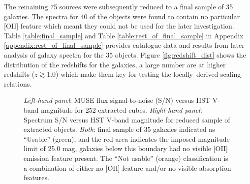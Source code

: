 \documentclass[12pt, twocolumn, nofootinbib]{revtex4-1}    %
\begin{document}
The remaining 75 sources were subsequently reduced to a final sample of 35 galaxies. The spectra for 40 of the objects were found to contain no particular [OII] feature which meant they could not be used for the later investigation. Table \ref{table:final_sample} and Table \ref{table:rest_of_final_sample} in Appendix \ref{appendix:rest_of_final_sample} provides catalogue data and results from later analysis of galaxy spectra for the 35 objects. Figure \ref{fig:redshift_dist} shows the distribution of the redshifts for the galaxies, a large number are at higher redshifts ($z\gtrsim1.0$) which make them key for testing the locally--derived scaling relations.  

\begin{figure}
  \caption[HUDF Objects]{\textit{Left-hand panel}: MUSE flux signal-to-noise (S/N) versus HST V-band magnitude for 252 extracted cubes. \textit{Right-hand panel}: Spectrum S/N versus HST V-band magnitude for reduced sample of extracted objects. \textit{Both}: final sample of 35 galaxies indicated as ``Usable'' (green), and the red area indicates the imposed magnitude limit of 25.0 mag, galaxies below this boundary had no visible [OII] emission feature present. The ``Not usable'' (orange) classification is a combination of either no [OII] feature and/or no visible absorption features.}
\label{fig:sn_vband}
\end{figure}
\end{document}
